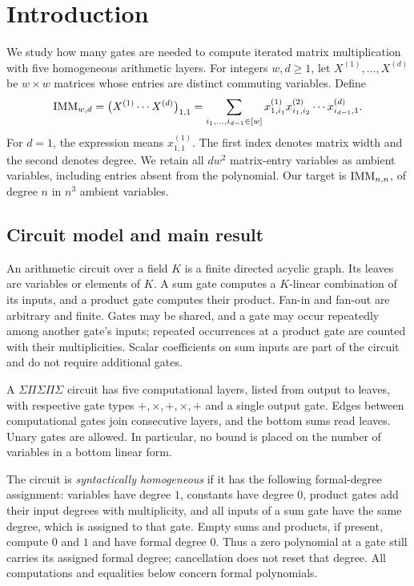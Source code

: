 \section{Introduction}
\label{sec:introduction}

We study how many gates are needed to compute iterated matrix multiplication
with five homogeneous arithmetic layers.  For integers $w,d\geq 1$, let
$X^{(1)},\ldots,X^{(d)}$ be $w\times w$ matrices whose entries are distinct
commuting variables.  Define
\begin{equation}
\label{eq:imm-definition}
 \operatorname{IMM}_{w,d}
 =\bigl(X^{(1)}\cdots X^{(d)}\bigr)_{1,1}
 =\sum_{i_1,\ldots,i_{d-1}\in[w]}
   x^{(1)}_{1,i_1}x^{(2)}_{i_1,i_2}\cdots x^{(d)}_{i_{d-1},1}.
\end{equation}
For $d=1$, the expression means $x^{(1)}_{1,1}$.  The first index denotes
matrix width and the second denotes degree.  We retain all $dw^2$ matrix-entry
variables as ambient variables, including entries absent from the polynomial.
Our target is $\operatorname{IMM}_{n,n}$, of degree $n$ in $n^3$ ambient variables.

\subsection{Circuit model and main result}

An arithmetic circuit over a field $K$ is a finite directed acyclic graph.
Its leaves are variables or elements of $K$.  A sum gate computes a
$K$-linear combination of its inputs, and a product gate computes their
product.  Fan-in and fan-out are arbitrary and finite.  Gates may be shared,
and a gate may occur repeatedly among another gate's inputs; repeated
occurrences at a product gate are counted with their multiplicities.
Scalar coefficients on sum inputs are part of the circuit and do not require
additional gates.

A $\Sigma\Pi\Sigma\Pi\Sigma$ circuit has five computational layers,
listed from output to leaves, with respective gate types
$+,\times,+,\times,+$ and a single output gate.  Edges between computational
gates join consecutive layers, and the bottom sums read leaves.  Unary gates
are allowed.  In particular, no bound is placed on the number of variables
in a bottom linear form.

The circuit is \emph{syntactically homogeneous} if it has the following
formal-degree assignment: variables have degree $1$, constants have degree
$0$, product gates add their input degrees with multiplicity, and all inputs
of a sum gate have the same degree, which is assigned to that gate.  Empty
sums and products, if present, compute $0$ and $1$ and have formal degree $0$.
Thus a zero polynomial at a gate still carries its assigned formal degree;
cancellation does not reset that degree.  All computations and equalities
below concern formal polynomials.


